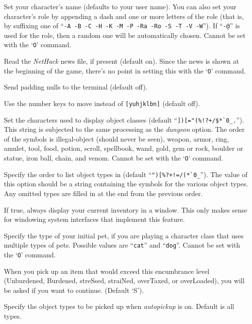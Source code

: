 \item[\ib{name}]
Set your character's name (defaults to your user name).  You can also
set your character's role by appending a dash and one or more letters of
the role (that is, by suffixing one of
``{\tt -A -B -C -H -K -M -P -Ra -Ro -S -T -V -W}'').
If ``{\tt -@}'' is used for the role, then a random one will be
automatically chosen.
Cannot be set with the `{\tt O}' command.
\item[\ib{news}]
Read the {\it NetHack\/} news file, if present (default on).
Since the news is shown at the beginning of the game, there's no point
in setting this with the `{\tt O}' command.
\item[\ib{null}]
Send padding nulls to the terminal (default off).
\item[\ib{number\_pad}]
Use the number keys to move instead of {\tt [yuhjklbn]} (default off).
\item[\ib{objects}]
Set the characters used to display object classes (default
``\verb&])[="(%!?+/$*`0_.&'').
This string is subjected to the same processing as the {\it dungeon\/} option.
The order of the symbols is
illegal-object (should never be seen), weapon, armor, ring, amulet, tool,
food, potion, scroll, spellbook, wand, gold, gem or rock, boulder or statue,
iron ball, chain, and venom.
Cannot be set with the `{\tt O}' command.
\item[\ib{packorder}]
Specify the order to list object types in (default
``\verb&")[%?+!=/(*`0_&''). The value of this option should be a string
containing the symbols for the various object types.  Any omitted types
are filled in at the end from the previous order.
\item[\ib{perm\_invent}]
If true, always display your current inventory in a window.  This only
makes sense for windowing system interfaces that implement this feature.
\item[\ib{pettype}]
Specify the type of your initial pet, if you are playing a character class
that uses multiple types of pets.  Possible values are ``{\tt cat}''
and ``{\tt dog}''.
Cannot be set with the `{\tt O}' command.
\item[\ib{pickup\_burden}]
When you pick up an item that would exceed this encumbrance
level (Unburdened, Burdened, streSsed, straiNed, overTaxed,
or overLoaded), you will be asked if you want to continue.
(Default `S').
\item[\ib{pickup\_types}]
Specify the object types to be picked up when {\it autopickup\/}
is on.  Default is all types.
